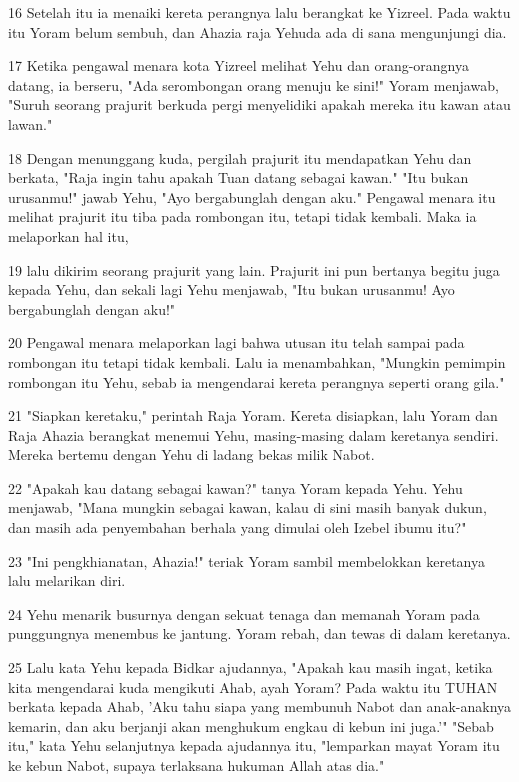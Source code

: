 \par 16 Setelah itu ia menaiki kereta perangnya lalu berangkat ke Yizreel. Pada waktu itu Yoram belum sembuh, dan Ahazia raja Yehuda ada di sana mengunjungi dia.
\par 17 Ketika pengawal menara kota Yizreel melihat Yehu dan orang-orangnya datang, ia berseru, "Ada serombongan orang menuju ke sini!" Yoram menjawab, "Suruh seorang prajurit berkuda pergi menyelidiki apakah mereka itu kawan atau lawan."
\par 18 Dengan menunggang kuda, pergilah prajurit itu mendapatkan Yehu dan berkata, "Raja ingin tahu apakah Tuan datang sebagai kawan." "Itu bukan urusanmu!" jawab Yehu, "Ayo bergabunglah dengan aku." Pengawal menara itu melihat prajurit itu tiba pada rombongan itu, tetapi tidak kembali. Maka ia melaporkan hal itu,
\par 19 lalu dikirim seorang prajurit yang lain. Prajurit ini pun bertanya begitu juga kepada Yehu, dan sekali lagi Yehu menjawab, "Itu bukan urusanmu! Ayo bergabunglah dengan aku!"
\par 20 Pengawal menara melaporkan lagi bahwa utusan itu telah sampai pada rombongan itu tetapi tidak kembali. Lalu ia menambahkan, "Mungkin pemimpin rombongan itu Yehu, sebab ia mengendarai kereta perangnya seperti orang gila."
\par 21 "Siapkan keretaku," perintah Raja Yoram. Kereta disiapkan, lalu Yoram dan Raja Ahazia berangkat menemui Yehu, masing-masing dalam keretanya sendiri. Mereka bertemu dengan Yehu di ladang bekas milik Nabot.
\par 22 "Apakah kau datang sebagai kawan?" tanya Yoram kepada Yehu. Yehu menjawab, "Mana mungkin sebagai kawan, kalau di sini masih banyak dukun, dan masih ada penyembahan berhala yang dimulai oleh Izebel ibumu itu?"
\par 23 "Ini pengkhianatan, Ahazia!" teriak Yoram sambil membelokkan keretanya lalu melarikan diri.
\par 24 Yehu menarik busurnya dengan sekuat tenaga dan memanah Yoram pada punggungnya menembus ke jantung. Yoram rebah, dan tewas di dalam keretanya.
\par 25 Lalu kata Yehu kepada Bidkar ajudannya, "Apakah kau masih ingat, ketika kita mengendarai kuda mengikuti Ahab, ayah Yoram? Pada waktu itu TUHAN berkata kepada Ahab, 'Aku tahu siapa yang membunuh Nabot dan anak-anaknya kemarin, dan aku berjanji akan menghukum engkau di kebun ini juga.'" "Sebab itu," kata Yehu selanjutnya kepada ajudannya itu, "lemparkan mayat Yoram itu ke kebun Nabot, supaya terlaksana hukuman Allah atas dia."
